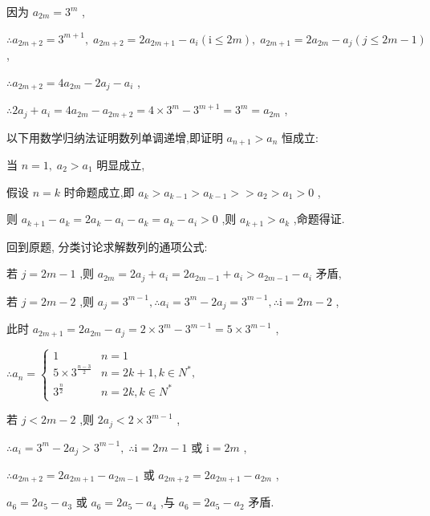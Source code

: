 \documentclass[10pt]{article}
\begin{document}
因为 \({a}_{2m} = {3}^{m}\) ,

\(\therefore {a}_{{2m} + 2} = {3}^{m + 1},\;{a}_{{2m} + 2} = 2{a}_{{2m} + 1} - {a}_{i}\left( {\mathrm{i} \leq  {2m}}\right) ,\;{a}_{{2m} + 1} = 2{a}_{2m} - {a}_{j}\left( {j \leq  {2m} - 1}\right)\) ,

\(\therefore {a}_{{2m} + 2} = 4{a}_{2m} - 2{a}_{j} - {a}_{i}\) ,

\(\therefore 2{a}_{j} + {a}_{i} = 4{a}_{2m} - {a}_{{2m} + 2} = 4 \times  {3}^{m} - {3}^{m + 1} = {3}^{m} = {a}_{2m}\) ,

以下用数学归纳法证明数列单调递增,即证明 \({a}_{n + 1} > {a}_{n}\) 恒成立:

当 \(n = 1,\;{a}_{2} > {a}_{1}\) 明显成立,

假设 \(n = k\) 时命题成立,即 \({a}_{k} > {a}_{k - 1} > {a}_{k - 1} >  > {a}_{2} > {a}_{1} > 0\) ,

则 \({a}_{k + 1} - {a}_{k} = 2{a}_{k} - {a}_{i} - {a}_{k} = {a}_{k} - {a}_{i} > 0\) ,则 \({a}_{k + 1} > {a}_{k}\) ,命题得证.

回到原题, 分类讨论求解数列的通项公式:

若 \(j = {2m} - 1\) ,则 \({a}_{2m} = 2{a}_{j} + {a}_{i} = 2{a}_{{2m} - 1} + {a}_{i} > {a}_{{2m} - 1} - {a}_{i}\) 矛盾,

若 \(j = {2m} - 2\) ,则 \({a}_{j} = {3}^{m - 1},\therefore {a}_{i} = {3}^{m} - 2{a}_{j} = {3}^{m - 1},\therefore \mathrm{i} = {2m} - 2\) ,

此时 \({a}_{{2m} + 1} = 2{a}_{2m} - {a}_{j} = 2 \times  {3}^{m} - {3}^{m - 1} = 5 \times  {3}^{m - 1}\) ,

\(\therefore {a}_{n} = \left\{  \begin{matrix} 1 & n = 1 \\  5 \times  {3}^{\frac{n - 3}{2}} & n = {2k} + 1,k \in  {N}^{ * }, \\  {3}^{\frac{n}{2}} & n = {2k},k \in  {N}^{ * } \end{matrix}\right.\)

若 \(j < {2m} - 2\) ,则 \(2{a}_{j} < 2 \times  {3}^{m - 1}\) ,

\(\therefore {a}_{i} = {3}^{m} - 2{a}_{j} > {3}^{m - 1},\;\therefore \mathrm{i} = {2m} - 1\) 或 \(\mathrm{i} = {2m}\) ,

\(\therefore {a}_{{2m} + 2} = 2{a}_{{2m} + 1} - {a}_{{2m} - 1}\) 或 \({a}_{{2m} + 2} = 2{a}_{{2m} + 1} - {a}_{2m}\) ,

\({a}_{6} = 2{a}_{5} - {a}_{3}\) 或 \({a}_{6} = 2{a}_{5} - {a}_{4}\) ,与 \({a}_{6} = 2{a}_{5} - {a}_{2}\) 矛盾.
\end{document}

